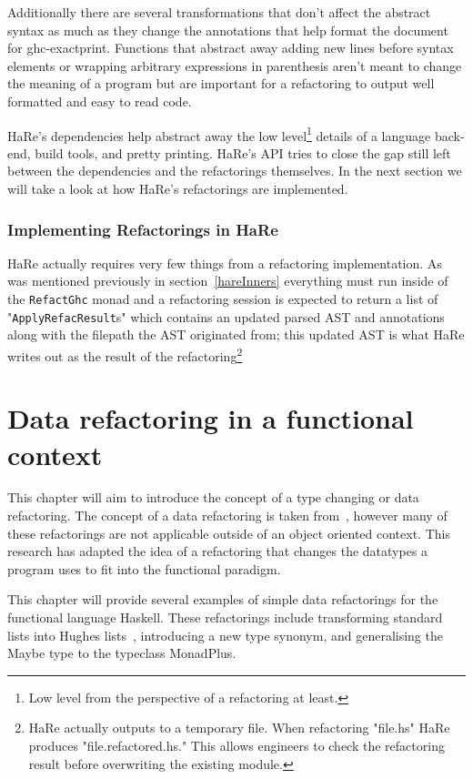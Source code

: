 Additionally there are several transformations that don't affect the abstract syntax as much as they change the annotations that help format the document for ghc-exactprint. Functions that abstract away adding new lines before syntax elements or wrapping arbitrary expressions in parenthesis aren't meant to change the meaning of a program but are important for a refactoring to output well formatted and easy to read code. 

HaRe's dependencies help abstract away the low level\footnote{Low level from the perspective of a refactoring at least.} details of a language back-end, build tools, and pretty printing. HaRe's API tries to close the gap still left between the dependencies and the refactorings themselves. In the next section we will take a look at how HaRe's refactorings are implemented.

\subsection{Implementing Refactorings in HaRe}

HaRe actually requires very few things from a refactoring implementation. As was mentioned previously in section~\ref{hareInners} everything must run inside of the \texttt{RefactGhc} monad and a refactoring session is expected to return a list of  "\texttt{ApplyRefacResult}s" which contains an updated parsed AST and annotations along with the filepath the AST originated from; this updated AST is what HaRe writes out as the result of the refactoring\footnote{HaRe actually outputs to a temporary file. When refactoring "file.hs" HaRe produces "file.refactored.hs." This allows engineers to check the refactoring result before overwriting the existing module.}  

\chapter{Data refactoring in a functional context}
This chapter will aim to introduce the concept of a type changing or data refactoring. The concept of a data refactoring is taken from~\cite{fowler}, however many of these refactorings are not applicable outside of an object oriented context. This research has adapted the idea of a refactoring that changes the datatypes a program uses to fit into the functional paradigm.

This chapter will provide several examples of simple data refactorings for the functional language Haskell. These refactorings include transforming standard lists into Hughes lists~\citep{hughesList}, introducing a new type synonym, and generalising the Maybe type to the typeclass MonadPlus. 

